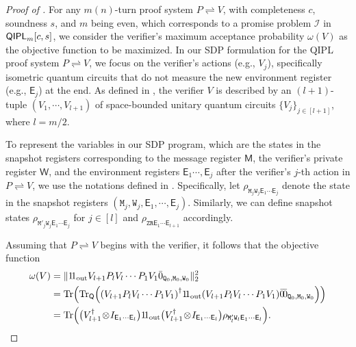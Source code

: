 \documentclass[10pt,a4paper]{article}
\numberwithin{equation}{section}
\numberwithin{figure}{section}
\newcommand{\QIPL}{\textnormal{\textsf{QIPL}}\xspace}
\newcommand{\protocol}[2]{{#1}\!\rightleftharpoons\!{#2}}
\DeclarePairedDelimiter\rbra{\lparen}{\rparen}
\let\ket\relax\DeclarePairedDelimiter\ket{\lvert}{\rangle}
\let\bra\relax\DeclarePairedDelimiter\bra{\langle}{\rvert}
\newcommand{\ketbra}[2]{\ensuremath{\ket{#1}\!\bra{#2}}}
\newcommand{\Tr}{\mathrm{Tr}}
\newcommand{\Out}{\mathrm{out}}
\newcommand{\calI}{\mathcal{I}}
\newcommand{\sfE}{\mathsf{E}}
\newcommand{\sfM}{\mathsf{M}}
\newcommand{\sfQ}{\mathsf{Q}}
\newcommand{\sfW}{\mathsf{W}}
\newcommand{\ttM}{\mathtt{M}}
\newcommand{\ttQ}{\mathtt{Q}}
\newcommand{\ttR}{\mathtt{R}}
\newcommand{\ttW}{\mathtt{W}}
\newcommand{\ttZ}{\mathtt{Z}}
\begin{document}
\begin{proof}[Proof of ]
    For any $m(n)$-turn proof system $\protocol{P}{V}$, with completeness $c$, soundness $s$, and $m$ being even, which corresponds to a promise problem $\calI$ in $\QIPL_m[c,s]$, we consider the verifier's maximum acceptance probability $\omega(V)$ as the objective function to be maximized. 
    In our SDP formulation for the \QIPL{} proof system $\protocol{P}{V}$, we focus on the verifier's actions (e.g., $V_j$), specifically isometric quantum circuits that do not measure the new environment register (e.g., $\sfE_j$) at the end. As defined in , the verifier $V$ is described by an $(l+1)$-tuple $(V_1,\cdots,V_{l+1})$ of space-bounded unitary quantum circuits $\{V_j\}_{j \in [l+1]}$, where $l = m/2$.   

    To represent the variables in our SDP program, which are the states in the snapshot registers corresponding to the message register $\sfM$, the verifier's private register $\sfW$, and the environment registers $\sfE_1\cdots,\sfE_j$ after the verifier's $j$-th action in $\protocol{P}{V}$, we use the notations defined in . Specifically, let $\rho_{\ttM_j\ttW_j\sfE_1\cdots\sfE_j}$ denote the state in the snapshot registers $(\ttM_j, \ttW_j, \sfE_1, \cdots, \sfE_j)$. Similarly, we can define snapshot states $\rho_{\ttM'_j\ttW_j\sfE_1\cdots\sfE_j}$ for $j\in[l]$ and $\rho_{\ttZ\ttR\sfE_1\cdots\sfE_{l+1}}$ accordingly. 

    \vspace{1em}
    Assuming that $\protocol{P}{V}$ begins with the verifier, it follows that the objective function
    \begin{equation}
        \label{eq:QIPUL-objective-function}
        \begin{aligned}
        \omega(V) &= \| \ketbra{1}{1}_{\Out} V_{l+1} P_l V_l \cdots P_1 V_1 \ket{\bar{0}}_{\ttQ_0,\ttM_0,\ttW_0}\|_2^2\\
        &= \Tr\rbra*{ \Tr_{\sfQ}\rbra*{ \rbra*{V_{l+1} P_l V_l \cdots P_1 V_1}^{\dagger} \ketbra{1}{1}_{\Out} \rbra*{V_{l+1} P_l V_l \cdots P_1 V_1} \ketbra{\bar{0}}{\bar{0}}_{\ttQ_0,\ttM_0,\ttW_0} } }\\
        &= \Tr\rbra*{ \big(V^{\dagger}_{l+1} \!\otimes\! I_{\sfE_1\cdots\sfE_{l}}\big) \ketbra{1}{1}_{\Out} \big(V^{\dagger}_{l+1} \!\otimes\! I_{\sfE_1\cdots\sfE_{l}}\big)  \rho_{\ttM'_l\ttW_l\sfE_1\cdots\sfE_l} }.
        \end{aligned}
    \end{equation}
    

\end{proof}
\end{document}
